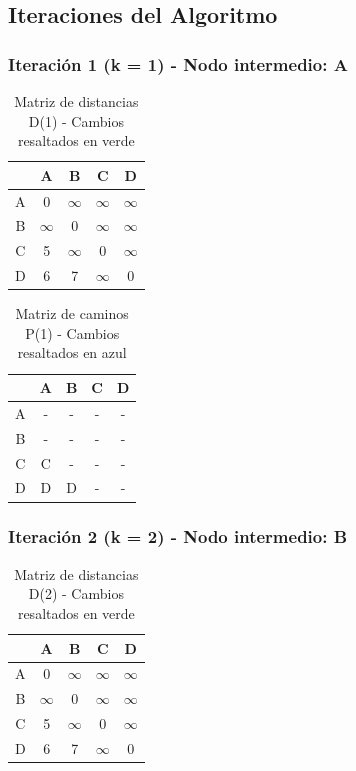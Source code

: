 \documentclass[12pt]{article}
\begin{document}
\clearpage
\subsection{Iteraciones del Algoritmo}
\subsubsection{Iteración 1 (k = 1) - Nodo intermedio: A}
\begin{table}[h!]
\centering
\begin{tabular}{|c|c|c|c|c|}
\hline
 & A & B & C & D \\\hline
A & 0 & $\infty$ & $\infty$ & $\infty$ \\\hline
B & $\infty$ & 0 & $\infty$ & $\infty$ \\\hline
C & 5 & $\infty$ & 0 & $\infty$ \\\hline
D & 6 & 7 & $\infty$ & 0 \\\hline
\end{tabular}
\caption{Matriz de distancias D(1) - Cambios resaltados en verde}
\end{table}

\begin{table}[h!]
\centering
\begin{tabular}{|c|c|c|c|c|}
\hline
 & A & B & C & D \\\hline
A & - & - & - & - \\\hline
B & - & - & - & - \\\hline
C & C & - & - & - \\\hline
D & D & D & - & - \\\hline
\end{tabular}
\caption{Matriz de caminos P(1) - Cambios resaltados en azul}
\end{table}

\subsubsection{Iteración 2 (k = 2) - Nodo intermedio: B}
\begin{table}[h!]
\centering
\begin{tabular}{|c|c|c|c|c|}
\hline
 & A & B & C & D \\\hline
A & 0 & $\infty$ & $\infty$ & $\infty$ \\\hline
B & $\infty$ & 0 & $\infty$ & $\infty$ \\\hline
C & 5 & $\infty$ & 0 & $\infty$ \\\hline
D & 6 & 7 & $\infty$ & 0 \\\hline
\end{tabular}
\caption{Matriz de distancias D(2) - Cambios resaltados en verde}
\end{table}
\end{document}
